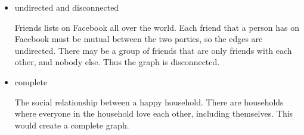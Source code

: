 \documentclass[10pt]{article}
\begin{document}
\begin{enumerate}
\begin{itemize}
			\item undirected and disconnected
				
				\vspace{0.5cm}
				Friends lists on Facebook all over the world. Each friend that a person has on Facebook must be mutual between the two parties, so the edges are undirected. There may be a group of friends that are only friends with each other, and nobody else. Thus the graph is disconnected.
				\vspace{0.5cm}
				
			\item complete
				
				\vspace{0.5cm}
				The social relationship between a happy household. There are households where everyone in the household love each other, including themselves. This would create a complete graph.
				\vspace{0.5cm}
		\end{itemize}
\end{enumerate}
\end{document}
